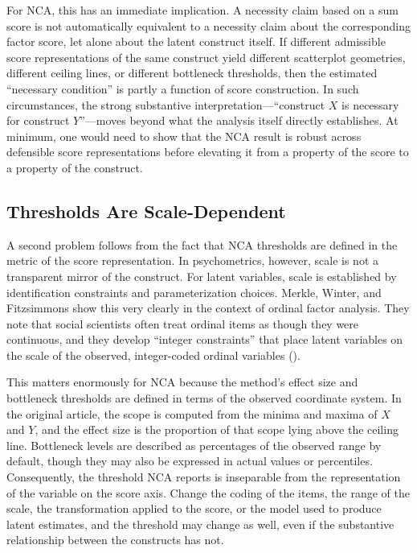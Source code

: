 \documentclass[
  man,
  longtable,
  nolmodern,
  notxfonts,
  notimes,
  colorlinks=true,linkcolor=blue,citecolor=blue,urlcolor=blue]{apa7}
\begin{document}
For NCA, this has an immediate implication. A necessity claim based on a
sum score is not automatically equivalent to a necessity claim about the
corresponding factor score, let alone about the latent construct itself.
If different admissible score representations of the same construct
yield different scatterplot geometries, different ceiling lines, or
different bottleneck thresholds, then the estimated ``necessary
condition'' is partly a function of score construction. In such
circumstances, the strong substantive interpretation---``construct \(X\)
is necessary for construct \(Y\)''---moves beyond what the analysis
itself directly establishes. At minimum, one would need to show that the
NCA result is robust across defensible score representations before
elevating it from a property of the score to a property of the
construct.

\subsection{Thresholds Are
Scale-Dependent}\label{thresholds-are-scale-dependent}

A second problem follows from the fact that NCA thresholds are defined
in the metric of the score representation. In psychometrics, however,
scale is not a transparent mirror of the construct. For latent
variables, scale is established by identification constraints and
parameterization choices. Merkle, Winter, and Fitzsimmons show this very
clearly in the context of ordinal factor analysis. They note that social
scientists often treat ordinal items as though they were continuous, and
they develop ``integer constraints'' that place latent variables on the
scale of the observed, integer-coded ordinal variables
().

This matters enormously for NCA because the method's effect size and
bottleneck thresholds are defined in terms of the observed coordinate
system. In the original article, the scope is computed from the minima
and maxima of \(X\) and \(Y\), and the effect size is the proportion of
that scope lying above the ceiling line. Bottleneck levels are described
as percentages of the observed range by default, though they may also be
expressed in actual values or percentiles. Consequently, the threshold
NCA reports is inseparable from the representation of the variable on
the score axis. Change the coding of the items, the range of the scale,
the transformation applied to the score, or the model used to produce
latent estimates, and the threshold may change as well, even if the
substantive relationship between the constructs has not.
\end{document}
